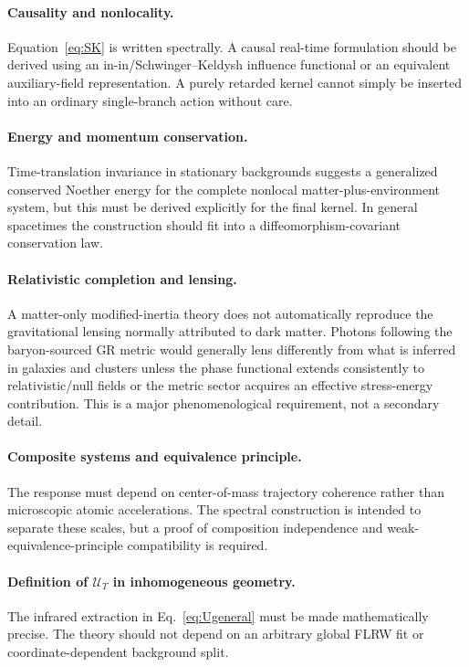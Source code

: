 \documentclass[11pt]{article}
\newcommand{\UT}{\mathcal{U}_{T}}
\begin{document}
\paragraph{Causality and nonlocality.}
Equation~\eqref{eq:SK} is written spectrally. A causal real-time formulation should be derived using an in-in/Schwinger--Keldysh influence functional or an equivalent auxiliary-field representation. A purely retarded kernel cannot simply be inserted into an ordinary single-branch action without care.

\paragraph{Energy and momentum conservation.}
Time-translation invariance in stationary backgrounds suggests a generalized conserved Noether energy for the complete nonlocal matter-plus-environment system, but this must be derived explicitly for the final kernel. In general spacetimes the construction should fit into a diffeomorphism-covariant conservation law.

\paragraph{Relativistic completion and lensing.}
A matter-only modified-inertia theory does not automatically reproduce the gravitational lensing normally attributed to dark matter. Photons following the baryon-sourced GR metric would generally lens differently from what is inferred in galaxies and clusters unless the phase functional extends consistently to relativistic/null fields or the metric sector acquires an effective stress-energy contribution. This is a major phenomenological requirement, not a secondary detail.

\paragraph{Composite systems and equivalence principle.}
The response must depend on center-of-mass trajectory coherence rather than microscopic atomic accelerations. The spectral construction is intended to separate these scales, but a proof of composition independence and weak-equivalence-principle compatibility is required.

\paragraph{Definition of $\UT$ in inhomogeneous geometry.}
The infrared extraction in Eq.~\eqref{eq:Ugeneral} must be made mathematically precise. The theory should not depend on an arbitrary global FLRW fit or coordinate-dependent background split.
\end{document}
